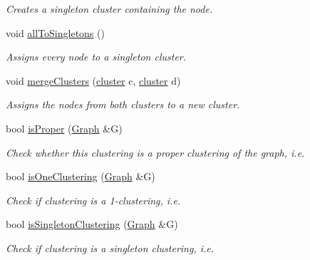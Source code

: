 \begin{DoxyCompactItemize}
\begin{DoxyCompactList}\small\item\em Creates a singleton cluster containing the node. \end{DoxyCompactList}\item 
void \hyperlink{class_ensemble_clustering_1_1_clustering_aa93abafed46c4707dac3ca4b0d445f79}{all\-To\-Singletons} ()
\begin{DoxyCompactList}\small\item\em Assigns every node to a singleton cluster. \end{DoxyCompactList}\item 
void \hyperlink{class_ensemble_clustering_1_1_clustering_a1cfe6fb096bef4aeb7814877847e2df9}{merge\-Clusters} (\hyperlink{namespace_ensemble_clustering_a5ae38234e207add524443be6e597b970}{cluster} c, \hyperlink{namespace_ensemble_clustering_a5ae38234e207add524443be6e597b970}{cluster} d)
\begin{DoxyCompactList}\small\item\em Assigns the nodes from both clusters to a new cluster. \end{DoxyCompactList}\item 
bool \hyperlink{class_ensemble_clustering_1_1_clustering_a6ef2d3f0c4a53532067a140caa531449}{is\-Proper} (\hyperlink{class_ensemble_clustering_1_1_graph}{Graph} \&G)
\begin{DoxyCompactList}\small\item\em Check whether this clustering is a proper clustering of the graph, i.\-e. \end{DoxyCompactList}\item 
bool \hyperlink{class_ensemble_clustering_1_1_clustering_ae00d7d11885b34c03969e213ec189a75}{is\-One\-Clustering} (\hyperlink{class_ensemble_clustering_1_1_graph}{Graph} \&G)
\begin{DoxyCompactList}\small\item\em Check if clustering is a 1-\/clustering, i.\-e. \end{DoxyCompactList}\item 
bool \hyperlink{class_ensemble_clustering_1_1_clustering_a49da98ece8e5e62638009ddf2cfa3929}{is\-Singleton\-Clustering} (\hyperlink{class_ensemble_clustering_1_1_graph}{Graph} \&G)
\begin{DoxyCompactList}\small\item\em Check if clustering is a singleton clustering, i.\-e. \end{DoxyCompactList}\item 

\end{DoxyCompactItemize}
